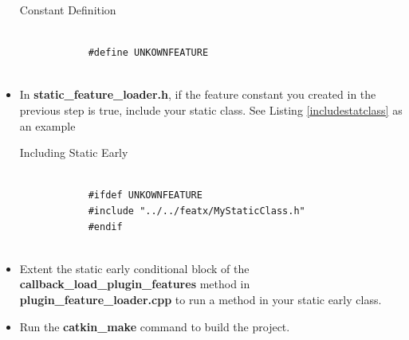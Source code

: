 \documentclass{article}
\newenvironment{longlisting}{\captionsetup{type=listing}}{}
\begin{document}
\begin{itemize}
	\begin{longlisting}
		\caption{Constant Definition}
		\begin{verbatim}
			
			#define UNKOWNFEATURE
			
		\end{verbatim}
		\label{definepreproccomm}
	\end{longlisting}
	
	\item In \textbf{static\_feature\_loader.h}, if the feature constant you created in the previous step is true, include your static class. See Listing \ref{includestatclass} as an example
	\begin{longlisting}
		\caption{Including Static Early}
		\begin{verbatim}
			
			#ifdef UNKOWNFEATURE
			#include "../../featx/MyStaticClass.h"
			#endif
			
		\end{verbatim}
		\label{includestatclass}
	\end{longlisting}

	\item Extent the static early conditional block of the \textbf{callback\_load\_plugin\_features} method in \textbf{plugin\_feature\_loader.cpp} to run a method in your static early class.
	
	\item Run the \textbf{catkin\_make} command to build the project.
\end{itemize}
\end{document}
